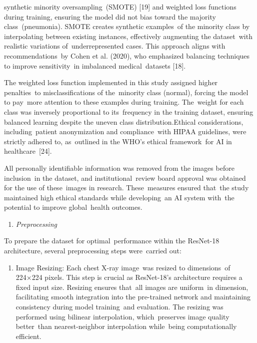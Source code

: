 \documentclass[
  twocolumn,
  10pt,
  a4paper,
  journal
]{IEEEtran}
\begin{document}
synthetic minority oversampling~(SMOTE) {[}19{]} and weighted loss functions during training, ensuring the model did not bias toward the majority class~(pneumonia). SMOTE creates synthetic examples~of the minority class by interpolating between existing instances, effectively augmenting the dataset~with realistic variations of~underrepresented cases. This approach aligns with recommendations~by Cohen et al. (2020), who emphasized balancing techniques to improve sensitivity~in imbalanced medical~datasets {[}18{]}.

The weighted loss function implemented in this study assigned higher penalties~to misclassifications of the~minority class (normal), forcing the model to pay~more attention to these examples during training. The~weight for each class was inversely proportional to its~frequency in the training dataset, ensuring balanced learning despite the uneven class distribution.Ethical considerations, including~patient anonymization and compliance~with HIPAA guidelines, were strictly adhered to, as~outlined in the WHO's ethical framework~for AI in healthcare~{[}24{]}.

All personally identifiable information was removed from the images before inclusion~in the dataset, and institutional~review board approval was obtained for the use of these~images in research. These~measures ensured that~the study maintained high ethical standards while developing~an AI system with~the potential to improve global~health outcomes.

\begin{enumerate}
\def\labelenumi{\Alph{enumi}.}
\setcounter{enumi}{3}
\item
  \emph{Preprocessing}
\end{enumerate}

To prepare the dataset for optimal~performance within the ResNet-18 architecture, several preprocessing steps were~carried out:

\begin{enumerate}
\def\labelenumi{\arabic{enumi}.}
\item
  Image Resizing: Each chest X-ray image~was resized to dimensions~of 224×224 pixels. This step is crucial as ResNet-18's architecture requires a fixed input size. Resizing ensures that~all images are uniform~in dimension, facilitating smooth integration into the pre-trained network and maintaining consistency during model training~and evaluation. The resizing was performed using bilinear interpolation, which~preserves image quality better~than nearest-neighbor interpolation while~being computationally efficient.
\end{enumerate}
\end{document}
